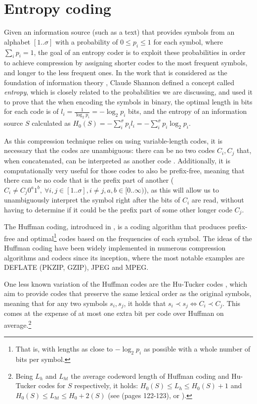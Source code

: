 \documentclass[a4paper,10pt,twoside]{book}
\begin{document}
	\section{Entropy coding}
	Given an information source (such as a text) that provides symbols from an alphabet $[1..\sigma]$ with a probability of $0 \leq p_i \leq 1$ for each symbol, where $\displaystyle\sum_ip_i=1$, the goal of an entropy coder is to exploit these probabilities in order to achieve compression by assigning shorter codes to the most frequent symbols, and longer to the less frequent ones. In the work that is considered as the foundation of information theory \cite{shannon1948mathematical}, Claude Shannon defined a concept called \textit{entropy}, which is closely related to the probabilities we are discussing, and used it to prove that the when encoding the symbols in binary, the optimal length in bits for each code is of $l_i = \frac{1}{\log_2p_i} = -\log_2p_i$ bits, and the entropy of an information source $S$ calculated as $H_0(S) = -\displaystyle\sum^\sigma_i p_il_i = -\displaystyle\sum^\sigma_i p_i\log_2p_i$.
	
	As this compression technique relies on using variable-length codes, it is necessary that the codes are unambiguous: there can be no two codes $C_i, C_j$ that, when concatenated, can be interpreted as another code 
	. Additionally, it is computationally very useful for those codes to also be prefix-free, meaning that there can be no code that is the prefix part of another ($C_i \neq C_j0^a1^b,~\forall i,j \in [1..\sigma], i\neq j, a,b \in [0..\infty)$), as this will allow us to unambiguously interpret the symbol right after the bits of $C_i$ are read, without having to determine if it could be the prefix part of some other longer code $C_j$.
	
	The Huffman coding, introduced in \cite{huffman1952method}, is a coding algorithm that produces prefix-free and optimal\footnote{That is, with lengths as close to $-\log_2p_i$ as possible with a whole number of bits per symbol.} codes based on the frequencies of each symbol. The ideas of the Huffman coding have been widely implemented in numerous compression algorithms and codecs since its inception, where the most notable examples are DEFLATE (PKZIP, GZIP), JPEG and MPEG.
	
	One less known variation of the Huffman codes are the Hu-Tucker codes \cite{hu1971optimal}, which aim to provide codes that preserve the same lexical order as the original symbols, meaning that for any two symbols $s_i,s_j$, it holds that $s_i \prec s_j \iff C_i \prec C_j$. This comes at the expense of at most one extra bit per code over Huffman on average.\footnote{Being $L_h$ and $L_{ht}$ the average codeword 
	length of Huffman coding and Hu-Tucker codes for $S$ respectively, it holds: $H_0(S) \leq L_h \leq H_0(S)+1$ and $H_0(S) \leq L_{ht} \leq H_0+2(S)$
	(see \cite{Cover:2006:EIT:1146355} (pages 122-123), or \cite{HORIBE1977148, GilbertandMore1959}).}
	
\end{document}
